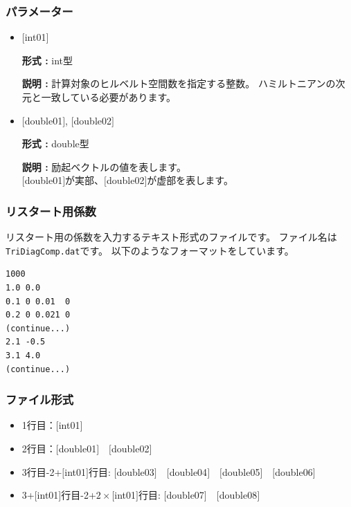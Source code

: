 \documentclass[12pt,titlepage]{jarticle}
\begin{document}
\subsubsection{パラメーター}
\begin{itemize}
  
\item  $[$int01$]$
  
  {\bf 形式 :} int型
  
  {\bf 説明 :} 計算対象のヒルベルト空間数を指定する整数。
  ハミルトニアンの次元と一致している必要があります。
 
\item  $[$double01$]$, $[$double02$]$
  
  {\bf 形式 :} double型 
  
  {\bf 説明 :} 励起ベクトルの値を表します。\\
  $[$double01$]$が実部、$[$double02$]$が虚部を表します。\\
\end{itemize}

\newpage
\subsubsection{リスタート用係数}\label{subsubsec:recoeff}
リスタート用の係数を入力するテキスト形式のファイルです。
ファイル名は\verb|TriDiagComp.dat|です。
以下のようなフォーマットをしています。
\\
\begin{minipage}{10cm}
  \begin{screen}
\begin{verbatim}
1000
1.0 0.0
0.1 0 0.01  0
0.2 0 0.021 0
(continue...)
2.1 -0.5
3.1 4.0
(continue...)
\end{verbatim}
  \end{screen}
\end{minipage}


\subsubsection{ファイル形式}
\begin{itemize}
\item  1行目：$[$int01$]$
\item  2行目：$[$double01$]$~~$[$double02$]$
\item  3行目-2+$[$int01$]$行目: $[$double03$]$~~$[$double04$]$~~$[$double05$]$~~$[$double06$]$
\item  3+$[$int01$]$行目-2+$2\times[$int01$]$行目: $[$double07$]$~~$[$double08$]$
\end{itemize}
\end{document}
